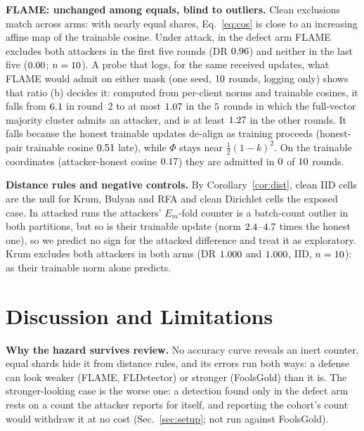 \documentclass[journal]{IEEEtran}
\begin{document}
\textbf{FLAME: unchanged among equals, blind to outliers.} Clean exclusions match across arms: with nearly equal shares, Eq.~\eqref{eq:cos} is
close to an increasing affine map of the trainable cosine. Under attack, in the defect arm
FLAME excludes both attackers in the first five rounds (DR $0.96$)
and neither in the last five ($0.00$; $n=10$). A probe that
logs, for the same received updates, what FLAME would admit on either mask (one seed,
$10$ rounds, logging only) shows that ratio (b) decides it: computed from
per-client norms and trainable cosines, it falls from $6.1$ in round~$2$ to at
most $1.07$ in the $5$ rounds in which the full-vector majority cluster
admits an attacker, and is at least $1.27$ in the other rounds. It falls because
the honest trainable updates de-align as training proceeds (honest-pair trainable cosine
$0.51$ late), while $\Phi$ stays near $\tfrac12(1-k)^2$. On the trainable
coordinates (attacker-honest cosine $0.17$) they are admitted in $0$ of $10$ rounds.

\textbf{Distance rules and negative controls.} By Corollary~\ref{cor:dist}, clean
IID cells are the null for Krum, Bulyan and RFA and clean Dirichlet cells the
exposed case. In attacked runs the attackers' $E_m$-fold counter is a batch-count
outlier in both partitions, but so is their trainable update (norm
$2.4$--$4.7$ times the honest one), so
we predict no sign for the attacked difference and treat it as exploratory. Krum
excludes both attackers in both arms (DR $1.000$ and $1.000$, IID,
$n=10$): as their trainable norm alone predicts.


\section{Discussion and Limitations}
\label{sec:discussion}

\textbf{Why the hazard survives review.} No accuracy curve reveals an inert
counter, equal shards hide it from distance rules, and its errors run both ways: a
defense can look weaker (FLAME, FLDetector) or stronger (FoolsGold) than it is. The stronger-looking case is the worse one:
a detection found only in the defect arm rests on a count the attacker reports for itself, and
reporting the cohort's count would withdraw it at no cost (Sec.~\ref{sec:setup}; not run against FoolsGold).
\end{document}

